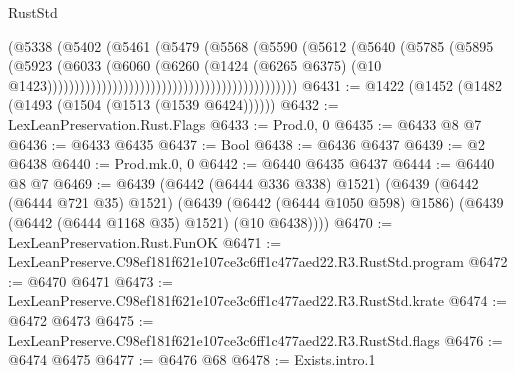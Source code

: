 \begin{lexlean}{RustStd}
\begin{coremodule}
                                                                (@5338
                                                                  (@5402
                                                                    (@5461
                                                                      (@5479
                                                                        (@5568
                                                                          (@5590
                                                                            (@5612
                                                                              (@5640
                                                                                (@5785
                                                                                  (@5895
                                                                                    (@5923
                                                                                      (@6033
                                                                                        (@6060
                                                                                          (@6260
                                                                                            (@1424
                                                                                              (@6265
                                                                                                @6375)
                                                                                              (@10
                                                                                                @1423))))))))))))))))))))))))))))))))))))))))))))))
@6431 := @1422 (@1452 (@1482 (@1493 (@1504 (@1513 (@1539 @6424))))))
@6432 := LexLeanPreservation.Rust.Flags
@6433 := Prod.{0, 0}
@6435 := @6433 @8 @7
@6436 := @6433 @6435
@6437 := Bool
@6438 := @6436 @6437
@6439 := @2 @6438
@6440 := Prod.mk.{0, 0}
@6442 := @6440 @6435 @6437
@6444 := @6440 @8 @7
@6469 := @6439
    (@6442 (@6444 @336 @338) @1521)
    (@6439
      (@6442 (@6444 @721 @35) @1521)
      (@6439 (@6442 (@6444 @1050 @598) @1586) (@6439 (@6442 (@6444 @1168 @35) @1521) (@10 @6438))))
@6470 := LexLeanPreservation.Rust.FunOK
@6471 := LexLeanPreserve.C98ef181f621e107ce3c6ff1c477aed22.R3.RustStd.program
@6472 := @6470 @6471
@6473 := LexLeanPreserve.C98ef181f621e107ce3c6ff1c477aed22.R3.RustStd.krate
@6474 := @6472 @6473
@6475 := LexLeanPreserve.C98ef181f621e107ce3c6ff1c477aed22.R3.RustStd.flags
@6476 := @6474 @6475
@6477 := @6476 @68
@6478 := Exists.intro.{1}

\end{coremodule}
\end{lexlean}
